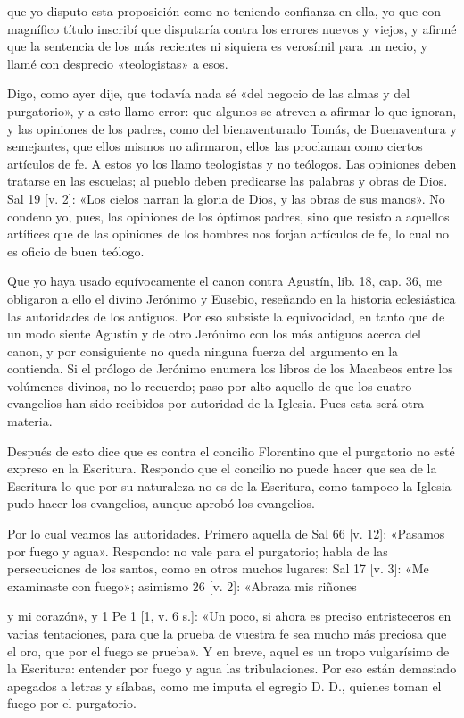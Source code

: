 que yo disputo esta proposición como no teniendo confianza en ella, yo que con magnífico título inscribí que disputaría contra los errores nuevos y viejos, y afirmé que la sentencia de los más recientes ni siquiera es verosímil para un necio, y llamé con desprecio «teologistas» a esos.

Digo, como ayer dije, que todavía nada sé «del negocio de las almas y del purgatorio», y a esto llamo error: que algunos se atreven a afirmar lo que ignoran, y las opiniones de los padres, como del bienaventurado Tomás, de Buenaventura y semejantes, que ellos mismos no afirmaron, ellos las proclaman como ciertos artículos de fe. A estos yo los llamo teologistas y no teólogos. Las opiniones deben tratarse en las escuelas; al pueblo deben predicarse las palabras y obras de Dios. Sal 19 [v. 2]: «Los cielos narran la gloria de Dios, y las obras de sus manos». No condeno yo, pues, las opiniones de los óptimos padres, sino que resisto a aquellos artífices que de las opiniones de los hombres nos forjan artículos de fe, lo cual no es oficio de buen teólogo.

Que yo haya usado equívocamente el canon contra Agustín, lib. 18, cap. 36, me obligaron a ello el divino Jerónimo y Eusebio, reseñando en la historia eclesiástica las autoridades de los antiguos. Por eso subsiste la equivocidad, en tanto que de un modo siente Agustín y de otro Jerónimo con los más antiguos acerca del canon, y por consiguiente no queda ninguna fuerza del argumento en la contienda. Si el prólogo de Jerónimo enumera los libros de los Macabeos entre los volúmenes divinos, no lo recuerdo; paso por alto aquello de que los cuatro evangelios han sido recibidos por autoridad de la Iglesia. Pues esta será otra materia.

Después de esto dice que es contra el concilio Florentino que el purgatorio no esté expreso en la Escritura. Respondo que el concilio no puede hacer que sea de la Escritura lo que por su naturaleza no es de la Escritura, como tampoco la Iglesia pudo hacer los evangelios, aunque aprobó los evangelios.

Por lo cual veamos las autoridades. Primero aquella de Sal 66 [v. 12]: «Pasamos por fuego y agua». Respondo: no vale para el purgatorio; habla de las persecuciones de los santos, como en otros muchos lugares: Sal 17 [v. 3]: «Me examinaste con fuego»; asimismo 26 [v. 2]: «Abraza mis riñones

y mi corazón», y 1 Pe 1 [1, v. 6 s.]: «Un poco, si ahora es preciso entristeceros en varias \marginpar{\small[330]} tentaciones, para que la prueba de vuestra fe sea mucho más preciosa que el oro, que por el fuego se prueba». Y en breve, aquel es un tropo vulgarísimo de la Escritura: entender por fuego y agua las tribulaciones. Por eso están demasiado apegados a letras y sílabas, como me imputa el egregio D. D., quienes toman el fuego por el purgatorio.

